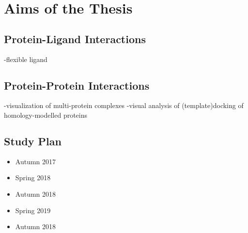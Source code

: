 \chapter{Aims of the Thesis}
\label{Sec:Aims}
\section{Protein-Ligand Interactions}
-flexible ligand
\section{Protein-Protein Interactions}
-visualization of multi-protein complexes
-visual analysis of (template)docking of homology-modelled proteins
\section{Study Plan}
\begin{itemize}
\renewcommand{\labelitemii}{$\circ$}
\item{Autumn 2017}
\item{Spring 2018}
\item{Autumn 2018}
\item{Spring 2019}
\item{Autumn 2018}
\end{itemize}

